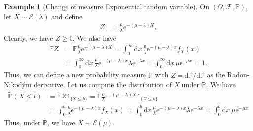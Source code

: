 \documentclass[12pt]{book}
\numberwithin{equation}{chapter}
\theoremstyle{plain}
\numberwithin{theorem}{section}
\theoremstyle{definition}
\newtheorem{example}[theorem]{\underline{Example}}
\newtheorem{exercise}{\underline{Exercise}}
\numberwithin{exercise}{chapter}
\newcommand{\<}{\langle}
\renewcommand{\>}{\rangle}
\renewcommand{\(}{\left(}
\renewcommand{\)}{\right)}
\renewcommand{\[}{\left[}
\renewcommand{\]}{\right]}
\newcommand\Eb{\mathds{E}}
\newcommand\Ib{\mathds{1}} 	%
\newcommand\Pb{\mathds{P}}
\newcommand\Ec{\mathscr{E}}
\newcommand\Fc{\mathscr{F}}
\newcommand\Gc{\mathscr{G}}
\newcommand\Om{\Omega}
\newcommand\sig{\sigma}
\newcommand\lam{\lambda}
\newcommand\Pbt{\widetilde{\Pb}}
\newcommand\dd{\mathrm{d}}
\newcommand\ee{\mathrm{e}}
\begin{document}
\begin{example}[Change of measure Exponential random variable]
On $(\Om, \Fc, \Pb)$, let $X \sim \Ec(\lam)$ and define
\begin{align}
Z
	&=	\frac{\mu}{\lam} \ee^{-(\mu - \lam)X} .
\end{align}
Clearly, we have $Z \geq 0$.  We also have
\begin{align}
\Eb Z
	&=	\Eb \frac{\mu}{\lam} \ee^{-(\mu - \lam)X}
	=		\int_0^\infty \dd x \, \frac{\mu}{\lam} \ee^{-(\mu - \lam)x} f_X(x) \\
	&=	\int_0^\infty \dd x \, \frac{\mu}{\lam} \ee^{-(\mu - \lam)x} \lam \ee^{- \lam x}
	=		\int_0^\infty \dd x \, \mu \ee^{-\mu x} = 1 .
\end{align}
Thus, we can define a new probability measure $\Pbt$ with $Z = \dd \Pbt / \dd \Pb$ as the Radon-Nikod\'ym derivative.
Let us compute the distribution of $X$ under $\Pbt$.  We have
\begin{align}
\Pbt(X \leq b)
	&=	\Eb Z \Ib_{\{X \leq b\}}
	=		\Eb \frac{\mu}{\lam} \ee^{-(\mu - \lam)X} \Ib_{\{X \leq b\}} \\
	&=		\int_0^b \frac{\mu}{\lam} \ee^{-(\mu - \lam)x}f_X(x)
	=		\int_0^b \dd x \, \frac{\mu}{\lam} \ee^{-(\mu - \lam)x} \lam \ee^{- \lam x}
	=		\int_0^b \dd x \, \mu \ee^{-\mu x}
\end{align}
Thus, under $\Pbt$, we have $X \sim \Ec(\mu)$.
\end{example}

%
%

\end{document}
